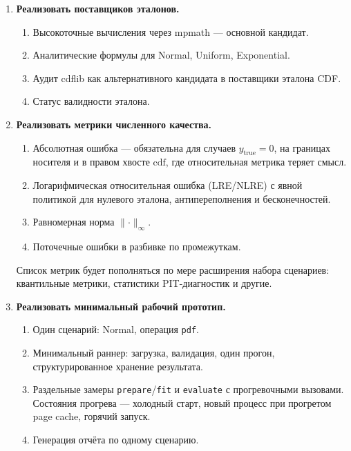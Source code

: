 \documentclass[12pt,a4paper]{article}
\begin{document}
\begin{enumerate}[label=\arabic*., leftmargin=*]
  \item \textbf{Реализовать поставщиков эталонов.}
  \begin{enumerate}[label=\arabic{enumi}.\arabic*., leftmargin=*]
    \item Высокоточные вычисления через mpmath --- основной кандидат.
    \item Аналитические формулы для Normal, Uniform, Exponential.
    \item Аудит cdflib как альтернативного кандидата в поставщики
          эталона CDF.
    \item Статус валидности эталона.
  \end{enumerate}

  \item \textbf{Реализовать метрики численного качества.}
  \begin{enumerate}[label=\arabic{enumi}.\arabic*., leftmargin=*]
    \item Абсолютная ошибка --- обязательна для случаев
          \(y_{\text{true}} = 0\), на границах носителя и в правом
          хвосте \(\mathrm{cdf}\), где относительная метрика теряет
          смысл.
    \item Логарифмическая относительная ошибка (LRE/NLRE) с явной
          политикой для нулевого эталона, антипереполнения
          и бесконечностей.
    \item Равномерная норма \(\lVert\cdot\rVert_\infty\).
    \item Поточечные ошибки в разбивке по промежуткам.
  \end{enumerate}
  Список метрик будет пополняться по мере расширения набора
  сценариев: квантильные метрики, статистики PIT-диагностик
  и другие.

  \item \textbf{Реализовать минимальный рабочий прототип.}
  \begin{enumerate}[label=\arabic{enumi}.\arabic*., leftmargin=*]
    \item Один сценарий: Normal, операция \texttt{pdf}.
    \item Минимальный раннер: загрузка, валидация, один прогон,
          структурированное хранение результата.
    \item Раздельные замеры \texttt{prepare}/\texttt{fit} и
          \texttt{evaluate} с прогревочными вызовами. Состояния
          прогрева --- холодный старт, новый процесс при прогретом
          page cache, горячий запуск.
    \item Генерация отчёта по одному сценарию.
  \end{enumerate}


\end{enumerate}
\end{document}
